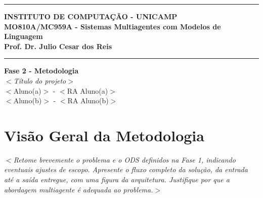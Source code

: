 \documentclass[12pt]{article}
\renewcommand{\headrulewidth}{0pt} %
\begin{document}
\vspace{5mm}
\hrule

\vspace{3mm}

\begin{center}
    {\large\textbf{INSTITUTO DE COMPUTAÇÃO - UNICAMP}} \\
    \vspace{3mm}
    {\large\textbf{MO810A/MC959A - Sistemas Multiagentes com Modelos de Linguagem}} \\
    \vspace{3mm}
    {\large\textbf{Prof. Dr. Julio Cesar dos Reis}}
\end{center}

\vspace{3mm}
\hrule

\vspace{2.5cm}
\begin{flushright}
    \Large{\textbf{Fase 2 - Metodologia}} \\
    \vspace{1cm}
    \textit{
        $<$Título do projeto$>$ \\
    }
    \vspace{5cm}
    $<$Aluno(a)$>$ - $<$RA Aluno(a)$>$ \\
    $<$Aluno(b)$>$ - $<$RA Aluno(b)$>$
\end{flushright}



\newpage
\pagestyle{fancy} %
\fancyhf{} %
\renewcommand{\headrulewidth}{0pt} %

\fancyfoot[R]{\thepage}



\section{Visão Geral da Metodologia}
\label{sec:visao_geral}

\textit{$<$Retome brevemente o problema e o ODS definidos na Fase 1, indicando eventuais ajustes de escopo. Apresente o fluxo completo da solução, da entrada até a saída entregue, com uma figura da arquitetura. Justifique por que a abordagem multiagente é adequada ao problema.$>$}
\end{document}
